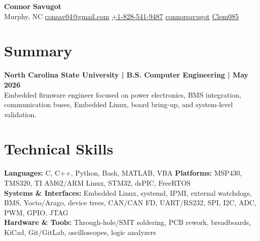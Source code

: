 \documentclass[10pt,letterpaper]{article}
\makeatletter
\newcommand{\mylocation}{Murphy, NC}
\newcommand{\myemail}{consav04@gmail.com}
\newcommand{\myphone}{+1-828-541-9487}
\newcommand{\mylinkedin}{connorsavugot}
\newcommand{\mygithub}{Clem085}
\makeatother
\begin{document}
\fontsize{8.8}{9.6}\selectfont
\sloppy

\AddToShipoutPictureBG{%
  \AtPageUpperLeft{\color{headergray}\rule[-1.58cm]{\paperwidth}{1.58cm}}%
}

\begin{center}
  {\fontsize{23}{24}\selectfont\bfseries Connor Savugot}\\[3pt]
  {\fontsize{8.2}{9}\selectfont
  \faMapMarker*\enspace \mylocation\enspace
  \faEnvelope\enspace \href{mailto:\myemail}{\myemail}\enspace
  \faPhone\enspace \href{tel:\myphone}{\myphone}\enspace
  \faLinkedinIn\enspace \href{https://linkedin.com/in/\mylinkedin}{\mylinkedin}\enspace
  \faGithub\enspace \href{https://github.com/\mygithub}{\mygithub}}
\end{center}
\vspace{-0.25cm}

\section{Summary}
\textbf{North Carolina State University | B.S. Computer Engineering | May 2026}\\
Embedded firmware engineer focused on power electronics, BMS integration, communication buses, Embedded Linux, board bring-up, and system-level validation.

\section{Technical Skills}
\textbf{Languages:} C, C++, Python, Bash, MATLAB, VBA \quad
\textbf{Platforms:} MSP430, TMS320, TI AM62/ARM Linux, STM32, dsPIC, FreeRTOS\\
\textbf{Systems \& Interfaces:} Embedded Linux, systemd, IPMI, external watchdogs, BMS, Yocto/Arago, device trees, CAN/CAN FD, UART/RS232, SPI, I2C, ADC, PWM, GPIO, JTAG\\
\textbf{Hardware \& Tools:} Through-hole/SMT soldering, PCB rework, breadboards, KiCad, Git/GitLab, oscilloscopes, logic analyzers
\end{document}

